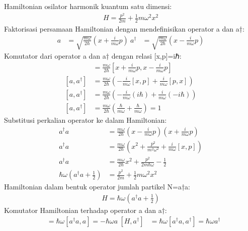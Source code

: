 Hamiltonian osilator harmonik kuantum satu dimensi:
\begin{align}
H = \frac{p^2}{2m} + \frac{1}{2}m\omega^2 x^2
\end{align}
Faktorisasi persamaan Hamiltonian dengan mendefinisikan operator a dan a†:
\begin{align}
a &= \sqrt{\frac{m\omega}{2\hbar}} \left( x + \frac{i}{m\omega} p \right) \
a^\dagger &= \sqrt{\frac{m\omega}{2\hbar}} \left( x - \frac{i}{m\omega} p \right)
\end{align}
Komutator dari operator a dan a† dengan relasi [x,p]=iℏ:
\begin{align}
[a, a^\dagger] &= \frac{m\omega}{2\hbar} \left[ x + \frac{i}{m\omega} p, x - \frac{i}{m\omega} p \right] \\
[a, a^\dagger] &= \frac{m\omega}{2\hbar} \left( -\frac{i}{m\omega}[x,p] + \frac{i}{m\omega}[p,x] \right) \\
[a, a^\dagger] &= \frac{m\omega}{2\hbar} \left( -\frac{i}{m\omega}(i\hbar) + \frac{i}{m\omega}(-i\hbar) \right) \\
[a, a^\dagger] &= \frac{m\omega}{2\hbar} \left( \frac{\hbar}{m\omega} + \frac{\hbar}{m\omega} \right) = 1
\end{align}
Substitusi perkalian operator ke dalam Hamiltonian:
\begin{align}
a^\dagger a &= \frac{m\omega}{2\hbar} \left( x - \frac{i}{m\omega} p \right) \left( x + \frac{i}{m\omega} p \right) \\
a^\dagger a &= \frac{m\omega}{2\hbar} \left( x^2 + \frac{p^2}{m^2\omega^2} + \frac{i}{m\omega}[x,p] \right) \\
a^\dagger a &= \frac{m\omega}{2\hbar} x^2 + \frac{p^2}{2m\hbar\omega} - \frac{1}{2} \\
\hbar\omega \left( a^\dagger a + \frac{1}{2} \right) &= \frac{p^2}{2m} + \frac{1}{2}m\omega^2 x^2
\end{align}
Hamiltonian dalam bentuk operator jumlah partikel N=a†a:
\begin{align}
H = \hbar\omega \left( a^\dagger a + \frac{1}{2} \right)
\end{align}
Komutator Hamiltonian terhadap operator a dan a†:
\begin{align}
[H, a] &= \hbar\omega [a^\dagger a, a] = -\hbar\omega a \
[H, a^\dagger] &= \hbar\omega [a^\dagger a, a^\dagger] = \hbar\omega a^\dagger
\end{align}

